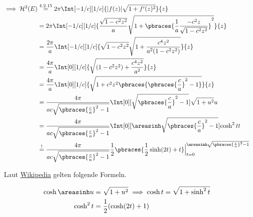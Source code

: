 \begin{solution}
\begin{align*}
    \implies
    \mathcal{H}^2(E)
    & \stackrel
    {
        \mathrm{4.2.15}
    }{=}
    2 \pi
    \Int[-1/c][1/c]
    {
        |f(z)|
        \sqrt{1 + f^\prime(z)^2}
    }{z} \\
    & =
    2 \pi
    \Int[-1/c][1/c]
    {
        \frac{\sqrt{1 - c^2 z^2}}{a}
        \sqrt
        {
            1
            +
            \pbraces
            {
                \frac{1}{a}
                \frac{-c^2 z}{\sqrt{1 - c^2 z^2}}
            }^2
        }
    }{z} \\
    & =
    \frac{2 \pi}{a}
    \Int[-1/c][1/c]
    {
        \sqrt{1 - c^2 z^2}
        \sqrt
        {
            1
            +
            \frac{c^4 z^2}{a^2 (1 - c^2 z^2)}
        }
    }{z} \\
    & =
    \frac{4 \pi}{a}
    \Int[0][1/c]
    {
        \sqrt
        {
            (1 - c^2 z^2)
            +
            \frac{c^4 z^2}{a^2}
        }
    }{z} \\
    & =
    \frac{4 \pi}{a}
    \Int[0][1/c]
    {
        \sqrt
        {
            1
            +
            c^2 z^2
            \pbraces
            {
                \pbraces{\frac{c}{a}}^2
                -
                1
            }
        }
    }{z} \\
    & =
    \frac{4 \pi}
    {
        a c
        \sqrt
        {
            \pbraces{\frac{c}{a}}^2 - 1
        }
    }
    \Int[0]
    [
        \sqrt
        {
            \pbraces{\frac{c}{a}}^2 - 1
        }
    ]
    {
        \sqrt{1 + u^2}
    }{u} \\
    & =
    \frac{4 \pi}
    {
        a c
        \sqrt
        {
            \pbraces{\frac{c}{a}}^2 - 1
        }
    }
    \Int[0]
    [
        \areasinh
        \sqrt
        {
            \pbraces{\frac{c}{a}}^2 - 1
        }
    ]
    {
        \cosh^2 t
    }{t} \\
    & \stackrel{!}{=}
    \frac{4 \pi}
    {
        a c
        \sqrt
        {
            \pbraces{\frac{c}{a}}^2 - 1
        }
    }
    \frac{1}{2}
    \pbraces
    {
        \frac{1}{2}
        \sinh(2 t)
        +
        t
    } \Big|_{t = 0}^{
        \areasinh
        \sqrt
        {
            \pbraces{\frac{c}{a}}^2 - 1
        }
    }
\end{align*}

Laut
\href{https://de.wikipedia.org/wiki/Sinus_hyperbolicus_und_Kosinus_hyperbolicus}{Wikipedia}
gelten folgende Formeln.

\begin{align*}
    \cosh \areasinh u & = \sqrt{1 + u^2}
    \implies
    \cosh t = \sqrt{1 + \sinh^2 t} \\
    \cosh^2 t & = \frac{1}{2} (\cosh(2 t) + 1)
\end{align*}


\end{solution}
